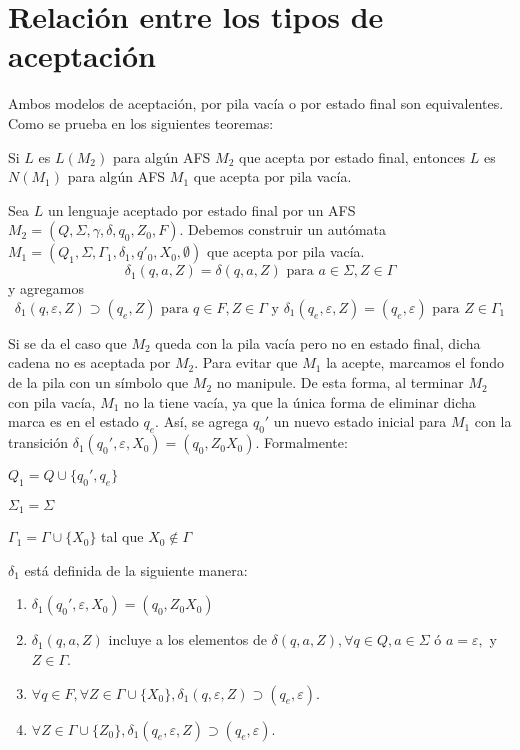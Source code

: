 \chapter{Relación entre los tipos de aceptación}

Ambos modelos de aceptación, por pila vacía o por estado final son equivalentes. Como se prueba en los siguientes teoremas:

\begin{Teo}
Si $L$ es $L(M_2)$ para algún AFS $M_2$ que acepta por estado final, entonces $L$ es $N(M_1)$ para algún AFS $M_1$ que acepta por pila vacía.
\end{Teo}

\begin{Dem}
Sea $L$ un lenguaje aceptado por estado final por un AFS $M_2=(Q,\Sigma, \gamma, \delta, q_0, Z_0,F)$. Debemos construir un autómata $M_1 = (Q_1,\Sigma, \Gamma_1, \delta_1,q'_0,X_0,\emptyset )$ que acepta por pila vacía. 
$$\delta_1(q,a,Z)=\delta (q,a,Z) \text{ para } a\in \Sigma,Z\in \Gamma $$
y agregamos
$$\delta_1(q,\varepsilon, Z) \supset (q_e,Z) \text{ para } q\in F,Z\in \Gamma \text{ y } \delta_1(q_e,\varepsilon, Z)=(q_e,\varepsilon ) \text{ para } Z\in \Gamma_1$$

Si se da el caso que $M_2$ queda con la pila vacía pero no en estado final, dicha cadena no es aceptada por $M_2$. Para evitar que $M_1$ la acepte, marcamos el fondo de la pila con un símbolo que $M_2$ no manipule. De esta forma, al terminar $M_2$ con pila vacía, $M_1$ no la tiene vacía, ya que la única forma de eliminar dicha marca es en el estado $q_e$. Así, se agrega $q_0'$ un nuevo estado inicial para $M_1$ con la transición $\delta_1(q_0',\varepsilon, X_0)=(q_0,Z_0X_0)$. Formalmente:

\begin{itemize*}
\item $Q_1=Q\cup \{q_0',q_e\}$
\item $\Sigma_1=\Sigma $
\item $\Gamma_1=\Gamma \cup \{X_0\}$ tal que $X_0\notin \Gamma $
\end{itemize*}
$\delta_1$ está definida de la siguiente manera:
\begin{enumerate}
\item $\delta_1(q_0',\varepsilon, X_0)=(q_0,Z_0X_0)$
\item $\delta_1 (q,a,Z)$ incluye a los elementos de $\delta (q,a,Z), \forall q\in Q, a \in \Sigma $ ó $a= \varepsilon, $ y $Z\in \Gamma$. 
\item $\forall q \in F, \forall Z\in \Gamma\cup \{X_0\},\delta_1(q,\varepsilon, Z)\supset (q_e,\varepsilon)$.
\item $\forall Z\in \Gamma \cup \{ Z_0 \}, \delta_1 (q_e,\varepsilon, Z) \supset (q_e,\varepsilon)$.
\end{enumerate}


\end{Dem}
